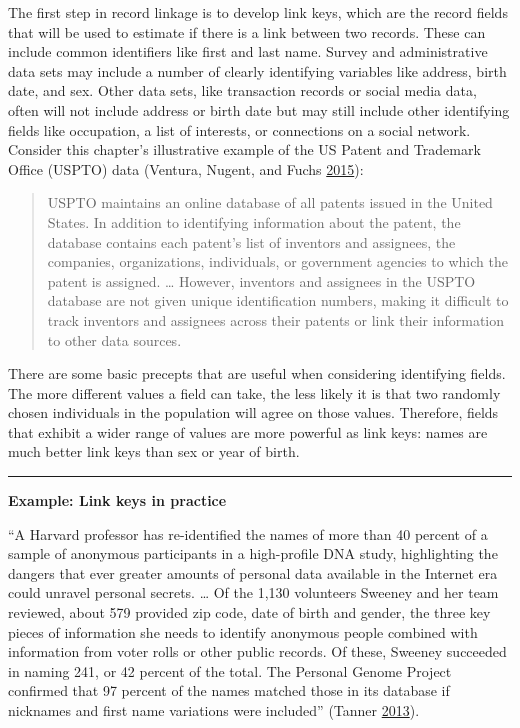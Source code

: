 \documentclass[]{krantz}
\begin{document}
The first step in record linkage is to develop link keys, which are the
record fields that will be used to estimate if there is a link between
two records. These can include common identifiers like first and last
name. Survey and administrative data sets may include a number of
clearly identifying variables like address, birth date, and sex. Other
data sets, like transaction records or social media data, often will not
include address or birth date but may still include other identifying
fields like occupation, a list of interests, or connections on a social
network. Consider this chapter's illustrative example of the US Patent
and Trademark Office (USPTO) data (Ventura, Nugent, and Fuchs
\protect\hyperlink{ref-ventura2015seeing}{2015}):

\begin{quote}
USPTO maintains an online database of all patents issued in the United
States. In addition to identifying information about the patent, the
database contains each patent's list of inventors and assignees, the
companies, organizations, individuals, or government agencies to which
the patent is assigned. \ldots{} However, inventors and assignees in the
USPTO database are not given unique identification numbers, making it
difficult to track inventors and assignees across their patents or link
their information to other data sources.
\end{quote}

There are some basic precepts that are useful when considering
identifying fields. The more different values a field can take, the less
likely it is that two randomly chosen individuals in the population will
agree on those values. Therefore, fields that exhibit a wider range of
values are more powerful as link keys: names are much better link keys
than sex or year of birth.

\begin{center}\rule{0.5\linewidth}{\linethickness}\end{center}

\textbf{Example: Link keys in practice}

``A Harvard professor has re-identified the names of more than 40
percent of a sample of anonymous participants in a high-profile DNA
study, highlighting the dangers that ever greater amounts of personal
data available in the Internet era could unravel personal secrets.
\ldots{} Of the 1,130 volunteers Sweeney and her team reviewed, about
579 provided zip code, date of birth and gender, the three key pieces of
information she needs to identify anonymous people combined with
information from voter rolls or other public records. Of these, Sweeney
succeeded in naming 241, or 42 percent of the total. The Personal Genome
Project confirmed that 97 percent of the names matched those in its
database if nicknames and first name variations were included'' (Tanner
\protect\hyperlink{ref-forbesharvard}{2013}).
\end{document}
